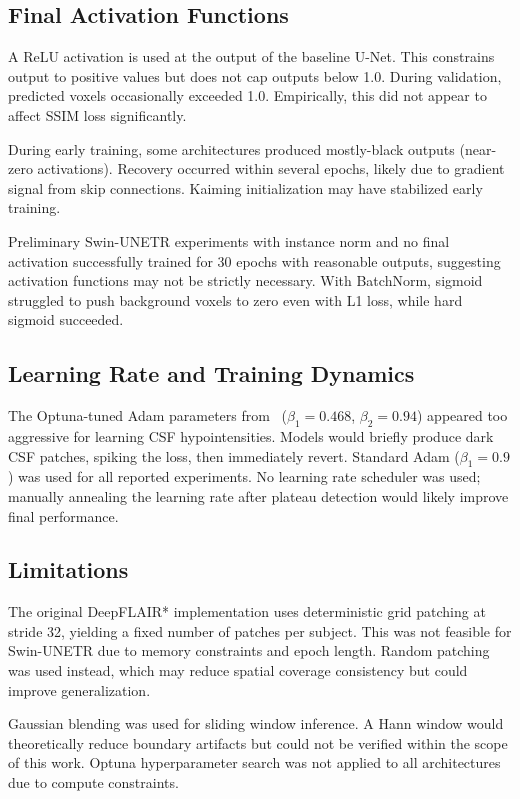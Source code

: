 \documentclass{article}
\begin{document}
\subsection{Final Activation Functions}

A ReLU activation is used at the output of the baseline U-Net. This
constrains output to positive values but does not cap outputs below 1.0.
During validation, predicted voxels occasionally exceeded 1.0. Empirically,
this did not appear to affect SSIM loss significantly.

During early training, some architectures produced mostly-black outputs
(near-zero activations). Recovery occurred within several epochs, likely due
to gradient signal from skip connections. Kaiming initialization may have
stabilized early training.

Preliminary Swin-UNETR experiments with instance norm and no final activation
successfully trained for 30 epochs with reasonable outputs, suggesting
activation functions may not be strictly necessary. With BatchNorm, sigmoid
struggled to push background voxels to zero even with L1 loss, while hard
sigmoid succeeded.

\subsection{Learning Rate and Training Dynamics}

The Optuna-tuned Adam parameters from~\cite{baburyan2025deepflair}
($\beta_1=0.468$, $\beta_2=0.94$) appeared too aggressive for learning CSF
hypointensities. Models would briefly produce dark CSF patches, spiking the
loss, then immediately revert. Standard Adam ($\beta_1=0.9$) was used for all
reported experiments. No learning rate scheduler was used; manually annealing
the learning rate after plateau detection would likely improve final
performance.

\subsection{Limitations}

The original DeepFLAIR* implementation uses deterministic grid patching at
stride 32, yielding a fixed number of patches per subject. This was not
feasible for Swin-UNETR due to memory constraints and epoch length. Random
patching was used instead, which may reduce spatial coverage consistency but
could improve generalization.

Gaussian blending was used for sliding window inference. A Hann window would
theoretically reduce boundary artifacts but could not be verified within the
scope of this work. Optuna hyperparameter search was not applied to all
architectures due to compute constraints.
\end{document}
